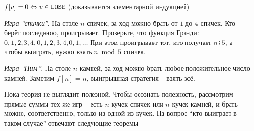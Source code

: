 
\begin{Lm}
$f[v] = 0 \Leftrightarrow v \in \texttt{LOSE}$ (доказывается элементарной индукцией)
\end{Lm}

\begin{Example}
{\it Игра ``спички''}. На столе $n$ спичек, за ход можно брать от $1$ до $4$ спичек.
Кто берёт последнюю, проигрывает.
Проверьте, что функция Гранди: $0, 1, 2, 3, 4, 0, 1, 2, 3, 4, 0, 1, \dots$
При этом проигрывает тот, кто получает $n\,\vdots\,5$,
а чтобы выиграть, нужно взять $n \bmod 5$ спичек.
\end{Example}

\begin{Example}
{\it Игра ``Ним''}. На столе $n$ камней, за ход можно брать любое положительное число камней.
Заметим $f[n] = n$, выигрышная стратегия -- взять всё.
\end{Example}

Пока теория не выглядит полезной. Чтобы осознать полезность, рассмотрим прямые суммы тех же игр --
есть $n$ кучек спичек или $n$ кучек камней, и брать можно, соответственно, только из одной из кучек.
На вопрос ``кто выиграет в таком случае'' отвечают следующие теоремы:

